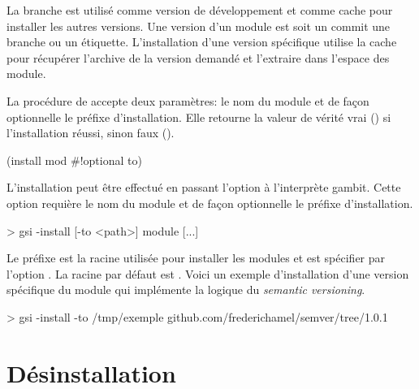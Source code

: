 La branche  est utilisé comme version de développement et
comme cache pour installer les autres versions. Une version d'un module est soit
un commit une branche ou un étiquette. L'installation d'une version
spécifique utilise la cache pour récupérer l'archive de la version demandé
et l'extraire dans l'espace des module.

La procédure  de  accepte deux paramètres:
le nom du module et de façon optionnelle le préfixe d'installation. Elle
retourne la valeur de vérité vrai () si l'installation réussi,
sinon faux ().
\begin{center}
  \begin{mplisting}{0.4}
(install mod #!optional to)
\end{mplisting}
\end{center}

L'installation peut être effectué en passant l'option 
à l'interprète gambit. Cette option requière le nom du module et
de façon optionnelle le préfixe d'installation.
\begin{center}
  \begin{mplisting}{0.8}
> gsi -install [-to <path>] module [...]
\end{mplisting}
\end{center}
Le préfixe  est la racine utilisée pour installer les modules
et est spécifier par l'option .  La racine par défaut est
. Voici un exemple d'installation d'une version spécifique du module
 qui implémente la logique du \textit{semantic versioning}.

\begin{center}
  \begin{mplisting}{1}
> gsi -install -to /tmp/exemple github.com/frederichamel/semver/tree/1.0.1
\end{mplisting}
\end{center}

\section{Désinstallation}

